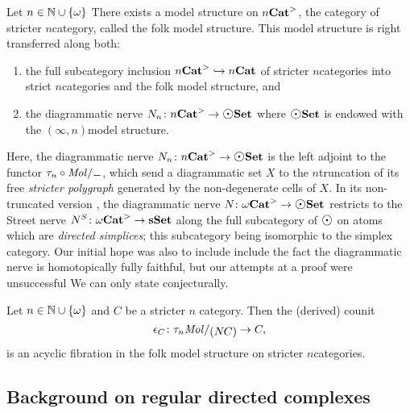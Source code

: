 \begin{thm*}
    Let \( n \in \mathbb{N} \cup \left\{ {\omega} \right\} \)
    There exists a model structure on \( {n\mathbf{Cat}}^>  \), the category of stricter \( n \)\nbd category, called the folk model structure.
    This model structure is right transferred along both:
    \begin{enumerate}
        \item the full subcategory inclusion \( {n\mathbf{Cat}}^> \hookrightarrow {n\mathbf{Cat}} \) of stricter \( n \)\nbd categories into strict \( n \)\nbd categories and the folk model structure, and
        \item the diagrammatic nerve \( \N{n} \colon \snCat{n} \to \dgmSet \) where \( \dgmSet \) is endowed with the \( (\infty, n) \)\nbd model structure. 
    \end{enumerate}
\end{thm*}
Here, the diagrammatic nerve \( \N{n} \colon \snCat{n} \to \dgmSet \) is the left adjoint to the functor \( \trunc{n} \after \molecin{-} \), which send a diagrammatic set \( X \) to the \( n \)\nbd truncation of its free \emph{stricter polygraph} generated by the non-degenerate cells of \( X \).
In its non-truncated version , the diagrammatic nerve \( \N{} \colon \somegaCat \to \dgmSet \) restricts to the Street nerve \( N^S \colon {\omega\mathbf{Cat}}^> \to \mathbf{sSet} \) along the full subcategory of \( \atom \) on atoms which are \emph{directed simplices}; this subcategory being isomorphic to the simplex category.
Our initial hope was also to include include the fact the diagrammatic nerve is homotopically fully faithful, but our attempts at a proof were unsuccessful
We can only state conjecturally.
\begin{conj*}
    Let \( n \in \mathbb{N} \cup \left\{ {\omega} \right\} \) and \( C \) be a stricter \( n \) \nbd category. 
    Then the (derived) counit
    \begin{equation*}
        \counit_C \colon \trunc{n} \molecin{(\N{}C)} \to C,
    \end{equation*}
    is an acyclic fibration in the folk model structure on stricter \( n \)\nbd categories.
\end{conj*}

\subsection*{Background on regular directed complexes}


